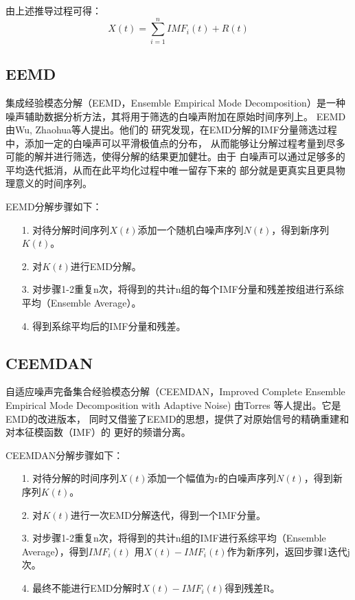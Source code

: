 \documentclass[AutoFakeBold]{LZUThesis}
\begin{document}
由上述推导过程可得：
$$
X(t)=\displaystyle\sum_{i=1} ^n IMF_i(t) +R(t)
$$

\subsection{EEMD}

集成经验模态分解（EEMD，Ensemble Empirical Mode Decomposition）是一种
噪声辅助数据分析方法，其将用于筛选的白噪声附加在原始时间序列上。
EEMD由Wu, Zhaohua等人提出。他们的
研究发现，在EMD分解的IMF分量筛选过程中，添加一定的白噪声可以平滑极值点的分布，
从而能够让分解过程考量到尽多可能的解并进行筛选，使得分解的结果更加健壮。由于
白噪声可以通过足够多的平均迭代抵消，从而在此平均化过程中唯一留存下来的
部分就是更真实且更具物理意义的时间序列。

EEMD分解步骤如下：
\begin{itemize}
\item[1. ] 对待分解时间序列$X(t)$添加一个随机白噪声序列$N(t)$，得到新序列$K(t)$。
\item[2. ] 对$K(t)$进行EMD分解。
\item[3. ] 对步骤1-2重复n次，将得到的共计n组的每个IMF分量和残差按组进行系综平均（Ensemble Average）。
\item[4. ] 得到系综平均后的IMF分量和残差。
\end{itemize}

\subsection{CEEMDAN}
自适应噪声完备集合经验模态分解（CEEMDAN，Improved Complete Ensemble
Empirical Mode Decomposition with Adaptive Noise) 由Torres
等人提出。它是EMD的改进版本，
同时又借鉴了EEMD的思想，提供了对原始信号的精确重建和对本征模函数（IMF）的
更好的频谱分离。

CEEMDAN分解步骤如下：
\begin{itemize}
\item[1. ] 对待分解的时间序列$X(t)$添加一个幅值为r的白噪声序列$N(t)$，得到新序列$K(t)$。
\item[2. ] 对$K(t)$进行一次EMD分解迭代，得到一个IMF分量。
\item[3. ] 对步骤1-2重复n次，将得到的共计n组的IMF进行系综平均（Ensemble Average），得到$IMF_i(t)$
用$X(t)-IMF_i(t)$作为新序列，返回步骤1迭代j次。
\item[4. ] 最终不能进行EMD分解时$X(t)-IMF_i(t)$得到残差R。
\end{itemize}
\end{document}
